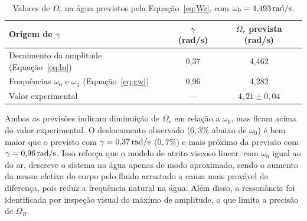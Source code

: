\begin{table}[H]
\centering
\caption{Valores de $\Omega_r$ na água previstos pela Equação~\eqref{eq:Wr}, com $\omega_0=4{,}493\,\mathrm{rad/s}$.}
\label{tab:comparacao}
\begin{tabular}{lcc}
\toprule
Origem de $\gamma$ & $\gamma$ (rad/s) & $\Omega_r$ prevista (rad/s) \\
\midrule
Decaimento da amplitude (Equação~\ref{eq:ln}) & 0,37 & 4,462 \\
Frequências $\omega_0$ e $\omega_1$ (Equação~\ref{eq:gw}) & 0,96 & 4,282 \\
\midrule
Valor experimental & --- & $4{,}21\pm0{,}04$ \\
\bottomrule
\end{tabular}
\end{table}

Ambas as previsões indicam diminuição de $\Omega_r$ em relação a $\omega_0$, mas ficam acima do valor experimental. O deslocamento observado ($6{,}3\%$ abaixo de $\omega_0$) é bem maior que o previsto com $\gamma=0{,}37\,\mathrm{rad/s}$ ($0{,}7\%$) e mais próximo da previsão com $\gamma=0{,}96\,\mathrm{rad/s}$. Isso reforça que o modelo de atrito viscoso linear, com $\omega_0$ igual ao do ar, descreve o sistema na água apenas de modo aproximado, sendo o aumento da massa efetiva do corpo pelo fluido arrastado a causa mais provável da diferença, pois reduz a frequência natural na água. Além disso, a ressonância foi identificada por inspeção visual do máximo de amplitude, o que limita a precisão de $\Omega_R$.
